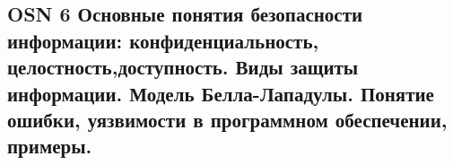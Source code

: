 \subsection{OSN 6 Основные понятия безопасности информации: конфиденциальность,
целостность,доступность. Виды защиты информации. Модель Белла-Лападулы.
Понятие ошибки, уязвимости в программном обеспечении, примеры.}
